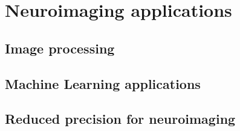 \chapter{Neuroimaging applications}
\label{ch:neuroimaging}
\begin{comment}
This section will discuss:
1. Image processing in neuroimaging
2. ML applications
3. Reduced precision for neuroimaging

In the first 2 bullet point, talk in about the general field, then focus on the
main topic of interest.
Setup the context of the topic to justify the methods used.
\end{comment}

\section{Image processing}

\section{Machine Learning applications}

\section{Reduced precision for neuroimaging}
